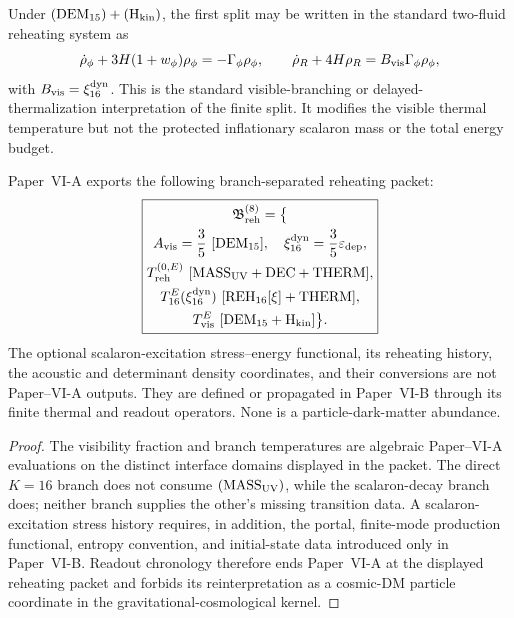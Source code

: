 \documentclass[12pt,a4paper]{article}
\begin{document}
\begin{remark}
\label{p8:rem:first-split-standard-reheating-reduction}
Under \((\mathrm{DEM}_{15})+(\mathrm H_{\rm kin})\), the first split may be
written in the standard two-fluid reheating system as
\[
\dot\rho_\phi+3H(1+w_\phi)\rho_\phi=-\Gamma_\phi\rho_\phi,
\qquad
\dot\rho_R+4H\rho_R=B_{\rm vis}\Gamma_\phi\rho_\phi,
\]
with \(B_{\rm vis}=\xi_{16}^{\rm dyn}\).  This is the standard visible-branching or delayed-
thermalization interpretation of the finite split.  It modifies the visible
thermal temperature but not the protected inflationary scalaron mass or the total
energy budget.

\end{remark}

\begin{proposition}
\label{p8:prop:scalaron-readout-handoff}
Paper~VI-A exports the following branch-separated reheating packet:
\begin{equation}
\label{p8:eq:scalaron-readout-export-packet}
\boxed{\begin{gathered}
\mathfrak B_{\rm reh}^{(8)}=\bigl\{\\
 A_{\rm vis}=\frac35\ [\mathrm{DEM}_{15}],\quad
 \xi_{16}^{\rm dyn}=\frac35\varepsilon_{\rm dep},\\
 T_{\rm reh}^{(0,E)}\ [\mathrm{MASS}_{\rm UV}+\mathrm{DEC}+\mathrm{THERM}],\\
 T_{16}^{E}(\xi_{16}^{\rm dyn})\ [\mathrm{REH}_{16}[\xi]+\mathrm{THERM}],\\
 T_{\rm vis}^{E}\ [\mathrm{DEM}_{15}+\mathrm H_{\rm kin}]\bigr\}.
\end{gathered}}
\end{equation}
The optional scalaron-excitation stress--energy functional, its reheating
history, the acoustic and determinant density coordinates, and their
conversions are not Paper--VI-A outputs.  They are defined or propagated in
Paper~VI-B through its finite thermal and readout operators.  None is a
particle-dark-matter abundance.
\end{proposition}

\begin{proof}
The visibility fraction and branch temperatures are algebraic Paper--VI-A
evaluations on the distinct interface domains displayed in the packet.  The
direct \(K=16\) branch does not consume \((\mathrm{MASS}_{\rm UV})\), while
the scalaron-decay branch does; neither branch supplies the other's missing
transition data.  A scalaron-excitation stress history requires, in addition,
the portal, finite-mode production functional, entropy convention, and
initial-state data introduced only in Paper~VI-B.  Readout
chronology therefore ends Paper~VI-A at the displayed reheating packet and
forbids its reinterpretation as a cosmic-DM particle coordinate in the
gravitational-cosmological kernel.
\end{proof}
\end{document}
